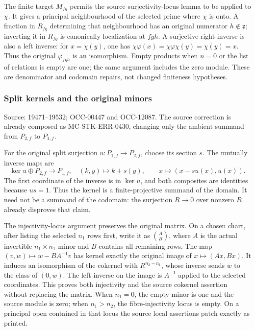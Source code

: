 The finite target \(M_{fg}\) permits the source surjectivity-locus lemma to be applied to \(\chi\). It gives a principal neighbourhood of the selected prime where \(\chi\) is onto. A fraction in \(R_{fg}\) determining that neighbourhood has an original numerator \(h\notin\mathfrak p\); inverting it in \(R_{fg}\) is canonically localization at \(fgh\). A surjective right inverse is also a left inverse: for \(x=\chi(y)\), one has \(\chi\varphi(x)=\chi\varphi\chi(y)=\chi(y)=x\). Thus the original \(\varphi_{fgh}\) is an isomorphism. Empty products when \(n=0\) or the list of relations is empty are one; the same argument includes the zero module. These are denominator and codomain repairs, not changed finiteness hypotheses.

\subsubsection{Split kernels and the original minors}\label{algebra-proof-010-split-kernels-and-the-original-minors}

Source: 19471--19532; OCC-00447 and OCC-12087. The source correction is already composed as MC-\AlgebraIdentifierBreak{}STK-\AlgebraIdentifierBreak{}ERR-\AlgebraIdentifierBreak{}0430, changing only the ambient summand from \(P_{2,f}\) to \(P_{1,f}\).

For the original split surjection \(u:P_{1,f}\to P_{2,f}\), choose its section \(s\). The mutually inverse maps are \[
\ker u\oplus P_{2,f}\longrightarrow P_{1,f},\quad(k,y)\mapsto k+s(y),
\qquad
x\longmapsto(x-su(x),u(x)).
\] The first coordinate of the inverse is in \(\ker u\), and both composites are identities because \(us=1\). Thus the kernel is a finite-projective summand of the domain. It need not be a summand of the codomain: the surjection \(R\to0\) over nonzero \(R\) already disproves that claim.

The injectivity-locus argument preserves the original matrix. On a chosen chart, after listing the selected \(n_1\) rows first, write it as \(\binom A B\), where \(A\) is the actual invertible \(n_1\times n_1\) minor and \(B\) contains all remaining rows. The map \((v,w)\mapsto w-BA^{-1}v\) has kernel exactly the original image of \(x\mapsto(Ax,Bx)\). It induces an isomorphism of the cokernel with \(R^{n_2-n_1}\), whose inverse sends \(w\) to the class of \((0,w)\). The left inverse on the image is \(A^{-1}\) applied to the selected coordinates. This proves both injectivity and the source cokernel assertion without replacing the matrix. When \(n_1=0\), the empty minor is one and the source module is zero; when \(n_1>n_2\), the fibre-injectivity locus is empty. On a principal open contained in that locus the source local assertions patch exactly as printed.

